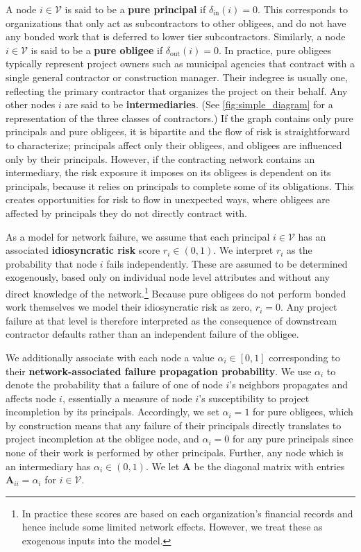 \documentclass[mnsc,nonblindrev]{informs3}
\newcommand{\din}{\delta_{\text{in}}}
\newcommand{\dout}{\delta_{\text{out}}}
\newcommand{\A}{\mathbf{A}}
\begin{document}
A node $i \in \mathcal{V}$ is said to be a {\bf pure principal} if $\din(i) = 0$. This corresponds to organizations that only act as subcontractors to other obligees, and do not have any bonded work that is deferred to lower tier subcontractors. Similarly, a node $i \in \mathcal{V}$ is said to be a {\bf pure obligee} if $\dout(i) = 0$.  
In practice, pure obligees typically represent project owners such as municipal agencies that contract with a single general contractor or construction manager. Their indegree is usually one, reflecting the primary contractor that organizes the project on their behalf.
Any other nodes $i$ are said to be {\bf intermediaries}. (See \cref{fig:simple_diagram} for a representation of the three classes of contractors.)
If the graph contains only pure principals and pure obligees, it is bipartite and the flow of risk is straightforward to characterize; principals affect only their obligees, and obligees are influenced only by their principals.  However, if the contracting network contains an intermediary, the risk exposure it imposes on its obligees is dependent on its principals, because it relies on principals to complete some of its obligations.  This creates opportunities for risk to flow in unexpected ways, where obligees are affected by principals they do not directly contract with.


As a model for network failure, we assume that each principal $i \in \mathcal{V}$ has an associated {\bf idiosyncratic risk} score $r_i \in (0,1)$.  We interpret $r_i$ as the probability that node $i$ fails independently.  These are assumed to be determined exogenously, based only on individual node level attributes and without any direct knowledge of the network.\footnote{In practice these scores are based on each organization's financial records and hence include some limited network effects. However, we treat these as exogenous inputs into the model.} 
Because pure obligees do not perform bonded work themselves we model their idiosyncratic risk as zero, $r_i=0$.  Any project failure at that level is therefore interpreted as the consequence of downstream contractor defaults rather than an independent failure of the obligee.

We additionally associate with each node a value $\alpha_i \in [0,1]$ corresponding to their {\bf network-associated failure propagation probability}.  We use $\alpha_i$ to denote the probability that a failure of one of node $i$'s neighbors propagates and affects node $i$, essentially a measure of node $i$'s susceptibility to project incompletion by its principals.  Accordingly, we set $\alpha_i=1$ for pure obligees, which by construction means that any failure of their principals directly translates to project incompletion at the obligee node, and $\alpha_i = 0$ for any {pure principals} since none of their work is performed by other principals.  Further, any node which is an {intermediary} has $\alpha_i \in (0,1)$.
 We let $\A$ be the diagonal matrix with entries $\A_{ii} = \alpha_i$ for $i \in \mathcal{V}$.
\end{document}
